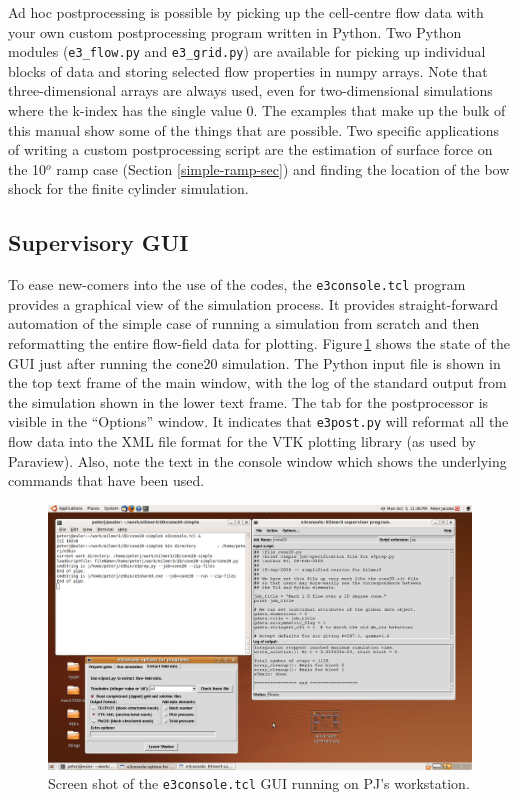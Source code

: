 \medskip 
Ad hoc postprocessing is possible by picking up the cell-centre flow
data with your own custom postprocessing program written in Python.
Two Python modules (\texttt{e3\_flow.py} and \texttt{e3\_grid.py}) 
are available for picking up individual blocks of data and storing
selected flow properties in numpy arrays.
Note that three-dimensional arrays are always used, even for two-dimensional simulations
where the k-index has the single value 0.
The examples that make up the bulk of this manual show some of the things that are possible.
Two specific applications of writing a custom postprocessing script are the estimation of 
surface force on the 10$^o$ ramp case (Section \ref{simple-ramp-sec}) and 
finding the location of the bow shock for the finite cylinder simulation.

\subsection{Supervisory GUI}
%
To ease new-comers into the use of the codes, the \texttt{e3console.tcl} program provides
a graphical view of the simulation process.
It provides straight-forward automation of the simple case of running a simulation
from scratch and then reformatting the entire flow-field data for plotting.
Figure\,\ref{e3console-screenshot-fig} shows the state of the GUI just after running the
cone20 simulation.
The Python input file is shown in the top text frame of the main window, 
with the log of the standard output from the simulation shown in the lower text frame.
The tab for the postprocessor is visible in the ``Options'' window.
It indicates that \texttt{e3post.py} will reformat all the flow data into the XML
file format for the VTK plotting library (as used by Paraview).
Also, note the text in the console window which shows the underlying commands that have been used. 

\begin{figure}
 \includegraphics[width=\textwidth]{figs/e3console-screenshot.png}
 \caption{Screen shot of the \texttt{e3console.tcl} GUI running on PJ's workstation.}
 \label{e3console-screenshot-fig}
\end{figure}
